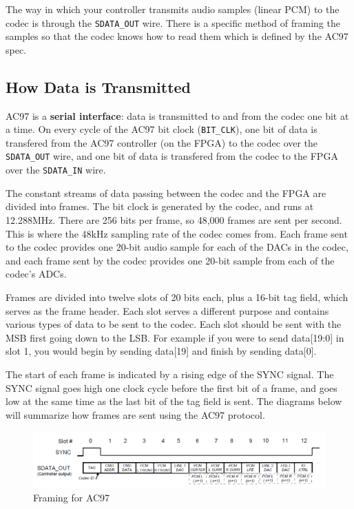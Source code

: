 \documentclass[11pt]{article}
\begin{document}
The way in which your controller transmits audio samples (linear PCM) to the codec is through the \verb|SDATA_OUT| wire. There is a specific method of framing the samples so that the codec knows how to read them which is defined by the AC97 spec.

\subsection{How Data is Transmitted}
AC97 is a \textbf{serial interface}: data is transmitted to and from the codec one bit at a time. On every cycle of the AC97 bit clock (\verb|BIT_CLK|), one bit of data is transfered from the AC97 controller (on the FPGA) to the codec over the \verb|SDATA_OUT| wire, and one bit of data is transfered from the codec to the FPGA over the \verb|SDATA_IN| wire.

The constant streams of data passing between the codec and the FPGA are divided into frames. The bit clock is generated by the codec, and runs at 12.288MHz. There are 256 bits per frame, so 48,000 frames are sent per second. This is where the 48kHz sampling rate of the codec comes from. Each frame sent to the codec provides one 20-bit audio sample for each of the DACs in the codec, and each frame sent by the codec provides one 20-bit sample from each of the codec's ADCs.

Frames are divided into twelve slots of 20 bits each, plus a 16-bit tag field, which serves as the frame header. Each slot serves a different purpose and contains various types of data to be sent to the codec. Each slot should be sent with the MSB first going down to the LSB. For example if you were to send data[19:0] in slot 1, you would begin by sending data[19] and finish by sending data[0].

The start of each frame is indicated by a rising edge of the SYNC signal. The SYNC signal goes high one clock cycle before the first bit of a frame, and goes low at the same time as the last bit of the tag field is sent. The diagrams below will summarize how frames are sent using the AC97 protocol.

\begin{figure}[hbt]
	\begin{center}
		\includegraphics[width=6in]{ac97_framing}
		\caption{Framing for AC97}
	\end{center}
\end{figure}
\end{document}
